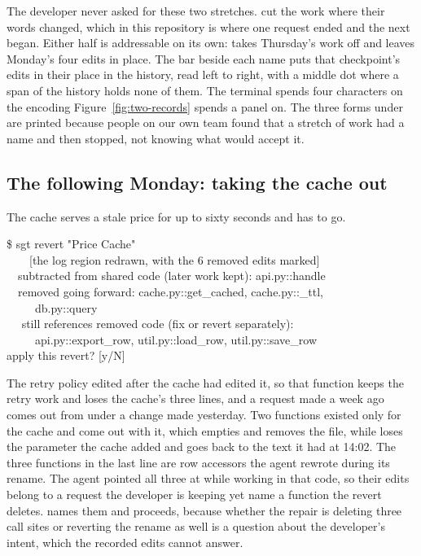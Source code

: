 \noindent
The developer never asked for these two stretches. \sgt{} cut the work where their
words changed, which in this repository is where one request ended and the next
began. Either half is addressable on its own:
 takes Thursday's work off and
leaves Monday's four edits in place. The bar beside each name puts that checkpoint's
edits in their place in the history, read left to right, with a middle dot where a
span of the history holds none of them. The terminal spends four characters on the
encoding Figure~\ref{fig:two-records} spends a panel on. The three forms under
 are printed because people on our own team found that a stretch of work
had a name and then stopped, not knowing what would accept it.

\subsection{The following Monday: taking the cache out}

The cache serves a stale price for up to sixty seconds and has to go.

\begin{out}
\$ sgt revert "Price Cache"\\
~~~~[the log region redrawn, with the 6 removed edits marked]\\
~~subtracted from shared code (later work kept): api.py::handle\\
~~removed going forward: cache.py::get\_cached, cache.py::\_ttl,\\
~~~~~db.py::query\\
~~\ttwarn{} still references removed code (fix or revert separately):\\
~~~~~api.py::export\_row, util.py::load\_row, util.py::save\_row\\[0.35ex]
apply this revert? [y/N]
\end{out}

\noindent
The retry policy edited  after the cache had edited it, so that
function keeps the retry work and loses the cache's three lines, and a request made a
week ago comes out from under a change made yesterday. Two functions existed only for
the cache and come out with it, which empties  and removes the file,
while  loses the parameter the cache added and goes back to the
text it had at 14:02. The three functions in the last line are row accessors the agent
rewrote during its rename. The agent pointed all three at  while
working in that code, so their edits belong to a request the developer is keeping
yet name a function the revert deletes. \sgt{} names them and proceeds, because whether the
repair is deleting three call sites or reverting the rename as well is a
question about the developer's intent, which the recorded edits cannot answer.

